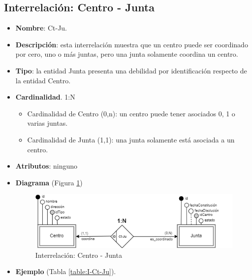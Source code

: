 \subsection{Interrelación: Centro - Junta}
\begin{itemize}
    \item \textbf{Nombre}: Ct-Ju.
    \item \textbf{Descripción}: esta interrelación muestra que un centro puede ser coordinado por cero, uno o más juntas, pero una junta solamente coordina un centro.
    \item \textbf{Tipo}: la entidad Junta presenta una debilidad por identificación respecto de la entidad Centro.
    \item \textbf{Cardinalidad}. 1:N
    \begin{itemize}
        \item Cardinalidad de Centro (0,n): un centro puede tener asociados 0, 1 o varias juntas.
        \item Cardinalidad de Junta (1,1): una junta solamente está asociada a un centro.
    \end{itemize}
    \item \textbf{Atributos}: ninguno
    \item \textbf{Diagrama} (Figura \ref{fig:I-Ct-Ju}) 
    \begin{figure}[H]
        \centering
        \includegraphics[scale=0.7]{img/diagramas/EER/I-Ct-Ju}
        \caption{Interrelación: Centro - Junta}
        \label{fig:I-Ct-Ju}
    \end{figure}
    
    \item \textbf{Ejemplo} (Tabla \ref{table:I-Ct-Ju}).


\end{itemize}
